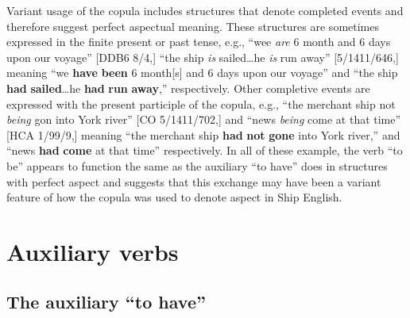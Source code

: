   Variant usage of the copula includes structures that denote completed events and therefore suggest perfect aspectual meaning. These structures are sometimes expressed in the finite present or past tense, e.g., “wee \textit{are} 6 month and 6 days upon our voyage” [DDB6 8/4,] “the ship \textit{is} sailed…he \textit{is} run away” [5/1411/646,] meaning “we \textbf{have} \textbf{been} 6 month[s] and 6 days upon our voyage” and “the ship \textbf{had }\textbf{sailed}…he \textbf{had} \textbf{run} \textbf{away},” respectively. Other completive events are expressed with the present participle of the copula, e.g., “the merchant ship not \textit{being} gon into York river” [CO 5/1411/702,] and “news \textit{being} come at that time” [HCA 1/99/9,] meaning “the merchant ship \textbf{had} \textbf{not} \textbf{gone} into York river,” and “news \textbf{had} \textbf{come} at that time” respectively. In all of these example, the verb “to be” appears to function the same as the auxiliary “to have” does in structures with perfect aspect and suggests that this exchange may have been a variant feature of how the copula was used to denote aspect in Ship English. 

\section{\textbf{Auxiliary} \textbf{verbs}}%

\subsection{\textbf{The} \textbf{auxiliary} \textbf{“to} \textbf{have”}}%


